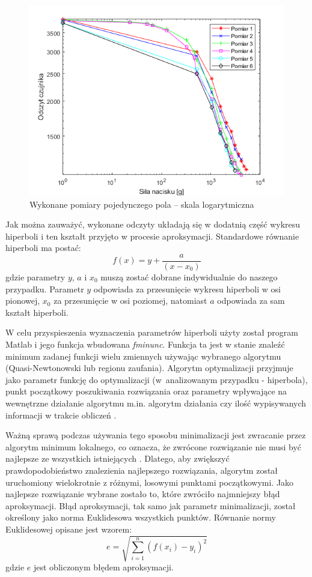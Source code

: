 \begin{figure}[!h]
    \centering 
    \includegraphics[width=0.85\linewidth]{img/badanie_1_logarytm.png}
    \caption{Wykonane pomiary pojedynczego pola -- skala logarytmiczna}
    \label{f_badanie_1_logarytm}
\end{figure}

Jak można zauważyć, wykonane odczyty układają się w dodatnią część wykresu hiperboli i ten kształt przyjęto w procesie aproksymacji. Standardowe równanie hiperboli ma postać:
\begin{equation}
    f(x) = y + \frac{a}{(x-x_0)}
\end{equation}
gdzie parametry $y$, $a$ i $x_0$ muszą zostać dobrane indywidualnie do naszego przypadku. Parametr $y$ odpowiada za przesunięcie wykresu hiperboli w osi pionowej, $x_0$ za przesunięcie w osi poziomej, natomiast $a$ odpowiada za sam kształt hiperboli.

W celu przyspieszenia wyznaczenia parametrów hiperboli użyty został program Matlab i jego funkcja wbudowana \textit{fminunc}. Funkcja ta jest w stanie znaleźć minimum zadanej funkcji wielu zmiennych używając wybranego algorytmu (Quasi-Newtonowski lub regionu zaufania). Algorytm optymalizacji przyjmuje jako parametr funkcję do optymalizacji (w~analizowanym przypadku - hiperbola), punkt początkowy poszukiwania rozwiązania oraz parametry wpływające na wewnętrzne działanie algorytmu m.in. algorytm działania czy ilość wypisywanych informacji w trakcie obliczeń \cite{b_site_Matlab_fminunc}.

Ważną sprawą podczas używania tego sposobu minimalizacji jest zwracanie przez algorytm minimum lokalnego, co oznacza, że zwrócone rozwiązanie nie musi być najlepsze ze wszystkich istniejących \cite{b_site_Matlab_fminunc}. Dlatego, aby zwiększyć prawdopodobieństwo znalezienia najlepszego rozwiązania, algorytm został uruchomiony wielokrotnie z różnymi, losowymi punktami początkowymi. Jako najlepsze rozwiązanie wybrane zostało to, które zwróciło najmniejszy błąd aproksymacji. Błąd aproksymacji, tak samo jak parametr minimalizacji, został określony jako norma Euklidesowa wszystkich punktów. Równanie normy Euklidesowej opisane jest wzorem:
\begin{equation}
    e = \sqrt{\sum_{i=1}^{n} (f(x_i) - y_i)^2}
\end{equation}
gdzie $e$ jest obliczonym błędem aproksymacji.

